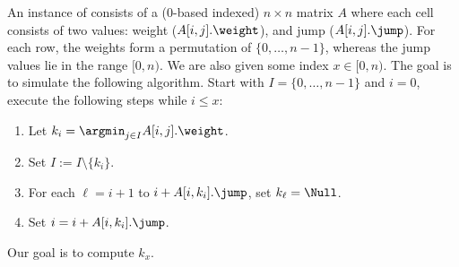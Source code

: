 \begin{problem}[\amj]\label{l:amj}
    An instance of \amj consists of a ($0$-based indexed) $n \times n$ matrix $A$ where each cell consists of two values: weight ($A[i,j].\weight$), and jump ($A[i,j].\jump$). For each row, the weights form a permutation of $\{0, \ldots, n-1\}$, whereas the jump values lie in the range $[0,n)$. We are also given some index $x \in [0, n)$. The goal is to simulate the following algorithm.
    Start with $I = \{0, \ldots, n-1\}$ and $i=0$, execute the following steps while $i \le x$:
    \begin{enumerate}
        \item Let $k_i = \argmin_{j \in I} A[i, j].\weight$.
        \item Set $I := I \setminus \{k_i\}$.
        \item For each $\ell=i+1$ to $i+A[i,k_i].\jump$, set $k_\ell = \Null$.
        \item Set $i = i + A[i, k_i].\jump$.
    \end{enumerate}
    Our goal is to compute $k_x$.
\end{problem}

